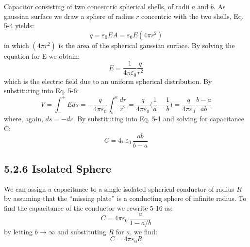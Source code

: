 \documentclass[12pt, a4paper]{article}
\begin{document}
		Capacitor consisting of two concentric spherical shells, of radii $a$ and $b$. As gaussian surface we draw a sphere of radius $r$ concentric with the two shells, Eq. 5-4 yields:
		\begin{equation*}
			q = \varepsilon_0 E A = \varepsilon_0 E (4 \pi r^2)
		\end{equation*}
		in which $(4 \pi r^2)$ is the area of the spherical gaussian surface. By solving the equation for E we obtain:
		\begin{equation*}
			E = \frac{1}{4 \pi \varepsilon_0} \frac{q}{r^2}
			\tag{5-14}
		\end{equation*}
		which is the electric field due to an uniform spherical distribution. By substituting into Eq. 5-6:
		\begin{equation*}
			V = \int_{-}^{+} E ds 
			  = - \frac{q}{4 \pi \varepsilon_0} \int_{b}^{a} \frac{dr}{r^2} 
			  = \frac{q}{4 \pi \varepsilon_0} \biggl( \frac{1}{a} - \frac{1}{b} \biggl)
				  = \frac{q}{4 \pi \varepsilon_0} \frac{b - a}{ab}
			\tag{5-15}
		\end{equation*}		
		where, again, $ds = -dr$. By substituting into Eq. 5-1 and solving for capacitance C:
		\begin{equation*}
			C = 4 \pi \varepsilon_0 \, \frac{ab}{b - a} 
			\tag{Spherical Capacitor, 5-16}
		\end{equation*}
	
	
		
		\subsection*{5.2.6 Isolated Sphere}
		
		We can assign a capacitance to a single isolated spherical conductor of radius $R$
		by assuming that the “missing plate” is a conducting sphere of infinite radius.
		To find the capacitance of the conductor we rewrite 5-16 as:
		\[
			C = 4 \pi \varepsilon_0 \, \frac{a}{1 - a/b}
		\]
		by letting $b \rightarrow \infty$ and substituting $R$ for $a$, we find:
		\[
			C = 4 \pi \varepsilon_0 R
			\tag{Isolated Sphere, 5-17}
		\]
		
		
		



	
\end{document}
